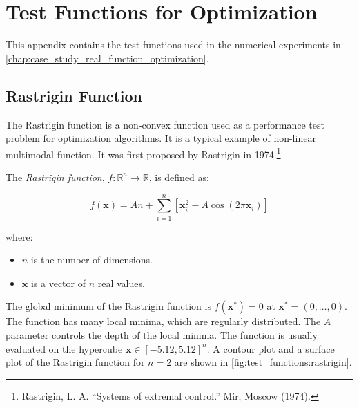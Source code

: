 \chapter{Test Functions for Optimization}
\label{chap:test_functions}
  This appendix contains the test functions used in the numerical experiments in 
  \vref{chap:case_study_real_function_optimization}.

  \section{Rastrigin Function}
  \label{sec:test_functions:rastrigin}
    The Rastrigin function is a non-convex function used as a performance test problem for 
    optimization algorithms.
    It is a typical example of non-linear multimodal function.
    It was first proposed by Rastrigin in 1974.\footnote{
      Rastrigin, L. A. \enquote{Systems of extremal control.} Mir, Moscow (1974).
    }

    \begin{definition}
      \label{def:test_functions:rastrigin}
      The \emph{Rastrigin function}, \(f: \mathbb{R}^n \rightarrow \mathbb{R}\), is defined as:

      \begin{equation}
        \label{eq:test_functions:rastrigin}
        f(\mathbf{x}) = An + \sum_{i=1}^{n} \left[ \mathbf{x}_i^2 - A\cos(2\pi \mathbf{x}_i) \right]
      \end{equation}
        
      where:

      \begin{itemize}
        \item \(n\) is the number of dimensions.
        \item \(\mathbf{x}\) is a vector of \(n\) real values.
      \end{itemize}
    \end{definition}

    The global minimum of the Rastrigin function is \(f(\mathbf{x}^*) = 0\) at \(\mathbf{x}^* = 
    (0, \ldots, 0)\).
    The function has many local minima, which are regularly distributed.
    The \(A\) parameter controls the depth of the local minima.
    The function is usually evaluated on the hypercube \(\mathbf{x} \in [-5.12, 5.12]^n\).
    A contour plot and a surface plot of the Rastrigin function for \(n = 2\) are shown in
    \vref{fig:test_functions:rastrigin}.

